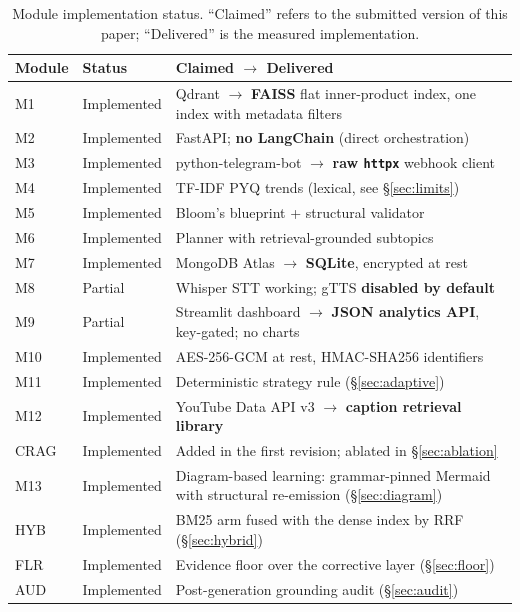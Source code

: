 \documentclass[conference]{IEEEtran}
\begin{document}
\begin{table}[htbp]
\caption{Module implementation status. ``Claimed'' refers to the submitted
version of this paper; ``Delivered'' is the measured implementation.}
\label{tab:status}
\centering
\begin{tabular}{p{0.9cm} p{2.4cm} p{3.6cm}}
\toprule
\textbf{Module} & \textbf{Status} & \textbf{Claimed $\rightarrow$ Delivered} \\
\midrule
M1 & Implemented & Qdrant $\rightarrow$ \textbf{FAISS} flat inner-product index, one index with metadata filters \\
M2 & Implemented & FastAPI; \textbf{no LangChain} (direct orchestration) \\
M3 & Implemented & python-telegram-bot $\rightarrow$ \textbf{raw \texttt{httpx}} webhook client \\
M4 & Implemented & TF-IDF PYQ trends (lexical, see §\ref{sec:limits}) \\
M5 & Implemented & Bloom's blueprint + structural validator \\
M6 & Implemented & Planner with retrieval-grounded subtopics \\
M7 & Implemented & MongoDB Atlas $\rightarrow$ \textbf{SQLite}, encrypted at rest \\
M8 & Partial & Whisper STT working; gTTS \textbf{disabled by default} \\
M9 & Partial & Streamlit dashboard $\rightarrow$ \textbf{JSON analytics API}, key-gated; no charts \\
M10 & Implemented & AES-256-GCM at rest, HMAC-SHA256 identifiers \\
M11 & Implemented & Deterministic strategy rule (§\ref{sec:adaptive}) \\
M12 & Implemented & YouTube Data API v3 $\rightarrow$ \textbf{caption retrieval library} \\
CRAG & Implemented & Added in the first revision; ablated in §\ref{sec:ablation} \\
M13 & Implemented & Diagram-based learning: grammar-pinned Mermaid with structural re-emission (§\ref{sec:diagram}) \\
HYB & Implemented & BM25 arm fused with the dense index by RRF (§\ref{sec:hybrid}) \\
FLR & Implemented & Evidence floor over the corrective layer (§\ref{sec:floor}) \\
AUD & Implemented & Post-generation grounding audit (§\ref{sec:audit}) \\
\bottomrule
\end{tabular}
\end{table}
\end{document}
